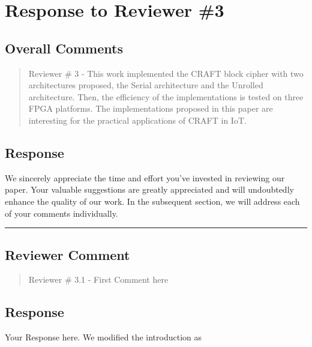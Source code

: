 \section{Response to Reviewer \#3}
\subsection*{Overall Comments}
\begin{mdframed}
	\begin{quote}
		Reviewer \# 3 - This work implemented the CRAFT block cipher with two architectures proposed, the Serial architecture and the Unrolled architecture. Then, the efficiency of the implementations is tested on three FPGA platforms. The implementations proposed in this paper are interesting for the practical applications of CRAFT in IoT.
	\end{quote}
\end{mdframed}

\subsection{Response}

We sincerely appreciate the time and effort you've invested in reviewing our paper. Your valuable suggestions are greatly appreciated and will undoubtedly enhance the quality of our work. In the subsequent section, we will address each of your comments individually.

\noindent\rule{\linewidth}{2.0pt}

\subsection{Reviewer Comment}
\begin{mdframed}
	\begin{quote}
		Reviewer \# 3.1 - First Comment here
	\end{quote}
\end{mdframed}

\subsection{Response}
Your Response here. We modified the introduction as


